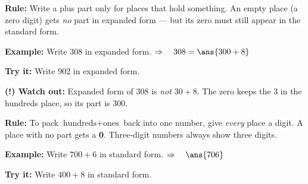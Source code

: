 \documentclass[12pt]{article}
\begin{document}


\begin{formulabox}
\textbf{Rule:} Write a plus part only for places that hold something.
An empty place (a zero digit) gets \emph{no} part in expanded form --- but
its zero must still appear in the standard form.
\end{formulabox}

\begin{examplebox}
\textbf{Example:} \quad Write 308 in expanded form.
$\Rightarrow\quad 308 = \ans{300 + 8}$
\end{examplebox}

\begin{tryitbox}
\textbf{Try it:} \quad Write 902 in expanded form.\\[2pt]
\end{tryitbox}

\begin{watchoutbox}
\textbf{(!) Watch out:} Expanded form of 308 is \emph{not} $30 + 8$. The
zero keeps the 3 in the hundreds place, so its part is 300.
\end{watchoutbox}


\begin{formulabox}
\textbf{Rule:} To pack $\text{hundreds} + \text{ones}$ back into one number,
give \emph{every} place a digit. A place with no part gets a \textbf{0}.
Three-digit numbers always show three digits.
\end{formulabox}

\begin{examplebox}
\textbf{Example:} \quad Write $700 + 6$ in standard form.
$\Rightarrow\quad \ans{706}$
\end{examplebox}

\begin{tryitbox}
\textbf{Try it:} \quad Write $400 + 8$ in standard form.\\[2pt]
\end{tryitbox}
\end{document}
